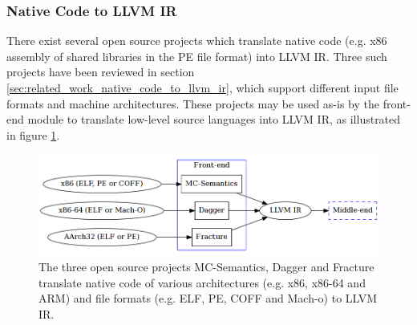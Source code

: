 
\subsubsection{Native Code to LLVM IR}
\label{sec:design_native_code_to_llvm_ir}

There exist several open source projects which translate native code (e.g. x86 assembly of shared libraries in the PE file format) into LLVM IR. Three such projects have been reviewed in section \ref{sec:related_work_native_code_to_llvm_ir}, which support different input file formats and machine architectures. These projects may be used as-is by the front-end module to translate low-level source languages into LLVM IR, as illustrated in figure \ref{fig:front-end_binary}.

\begin{figure}[htbp]
	\begin{center}
		\includegraphics[width=\textwidth]{inc/front-end_binary.png}
		\caption{The three open source projects MC-Semantics, Dagger and Fracture translate native code of various architectures (e.g. x86, x86-64 and ARM) and file formats (e.g. ELF, PE, COFF and Mach-o) to LLVM IR.}
		\label{fig:front-end_binary}
	\end{center}
\end{figure}
